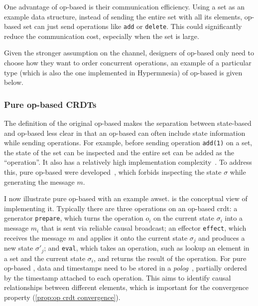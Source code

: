 One advantage of op-based  is their communication efficiency.
Using a set as an example data structure, instead of sending the
entire set with all its elements,
op-based set can just send operations like \texttt{add} or \texttt{delete}.
This could significantly reduce the communication cost, especially when the set is large.

Given the stronger assumption on the channel, designers of op-based 
only need to choose how they want to
order concurrent operations, an example of a particular type (which is also
the one implemented in Hypermnesia) of op-based  is given below.

\subsubsection{Pure op-based CRDTs}

The definition of the original op-based  makes the separation 
between state-based and op-based  less clear in that an op-based
 can often include state information while sending operations. 
For example, before sending operation \texttt{add(1)} on a set, the state of the 
set can be inspected and the entire set can be added as the ``operation''. It also has 
a relatively high implementation complexity~\cite{bauwens2021Reactivity}. 
To address this, pure op-based  were 
developed~\cite{baquero2017PureOp,baquero2014PureOp}, which forbids inspecting
the state \(\sigma\) while generating the message \(m\).

I now illustrate pure op-based  with an example \acrfull{awset}.
 is the conceptual view of implementing it.
Typically there are three operations on an op-based \acrshort{crdt}: a generator
\verb|prepare|, which turns the operation \(o_i\) on the current state \(\sigma_i\) into a 
message \(m_i\) that is sent via reliable causal broadcast; an effector 
\verb|effect|, which receives the message \(m\) and applies it onto the current state \(\sigma_j\)
and produces a new state \(\sigma'_j\); and \verb|eval|, which takes an operation,
such as lookup an element in a set and the current state \(\sigma_i\), and returns
the result of the operation.
For pure op-based , data and timestamps need to be stored in 
a \emph{\acrfull{polog}}~\cite{baquero2017PureOp,baquero2014PureOp},
partially ordered by the timestamp attached to each operation. This aims to 
identify causal relationships between different elements, which is important
for the convergence property (\cref{prop:op crdt convergence}).

